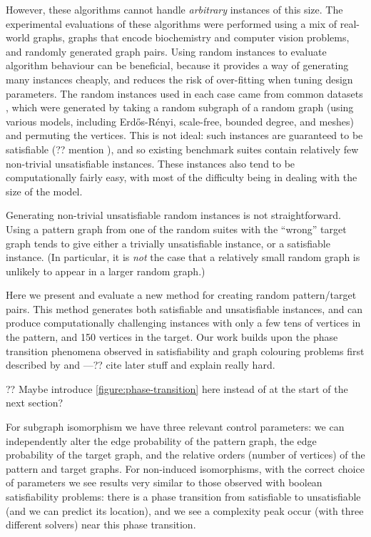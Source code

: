 \documentclass[letterpaper]{article}
\begin{document}
However, these algorithms cannot handle \emph{arbitrary} instances of this size. The experimental
evaluations of these algorithms were performed using a mix of real-world graphs, graphs that encode
biochemistry and computer vision problems, and randomly generated graph pairs. Using random
instances to evaluate algorithm behaviour can be beneficial, because it provides a way of generating
many instances cheaply, and reduces the risk of over-fitting when tuning design parameters. The
random instances used in each case came from common datasets \citep{DeSanto:2003,Zampelli:2010},
which were generated by taking a random subgraph of a random graph (using various models, including
Erd\H{o}s-R\'enyi, scale-free, bounded degree, and meshes) and permuting the vertices.  This is not
ideal: such instances are guaranteed to be satisfiable (?? mention \citep{Anton:2009}), and so
existing benchmark suites contain relatively few non-trivial unsatisfiable instances. These
instances also tend to be computationally fairly easy, with most of the difficulty being in dealing
with the size of the model.

Generating non-trivial unsatisfiable random instances is not straightforward. Using a
pattern graph from one of the random suites with the ``wrong'' target graph tends to give either a
trivially unsatisfiable instance, or a satisfiable instance. (In particular, it is \emph{not} the
case that a relatively small random graph is unlikely to appear in a larger random graph.)

Here we present and evaluate a new method for creating random pattern/target pairs. This method
generates both satisfiable and unsatisfiable instances, and can produce computationally challenging
instances with only a few tens of vertices in the pattern, and 150 vertices in the target. Our work
builds upon the phase transition phenomena observed in satisfiability and graph colouring problems
first described by \citet{Cheeseman:1991} and \citet{Mitchell:1992}---?? cite later stuff and
explain really hard.

?? Maybe introduce \cref{figure:phase-transition} here instead of at the start of the next section?

For subgraph isomorphism we have three relevant control parameters: we can independently alter the
edge probability of the pattern graph, the edge probability of the target graph, and the relative
orders (number of vertices) of the pattern and target graphs.  For non-induced isomorphisms, with
the correct choice of parameters we see results very similar to those observed with boolean
satisfiability problems: there is a phase transition from satisfiable to unsatisfiable (and we can
predict its location), and we see a complexity peak occur (with three different solvers) near this
phase transition.
\end{document}
